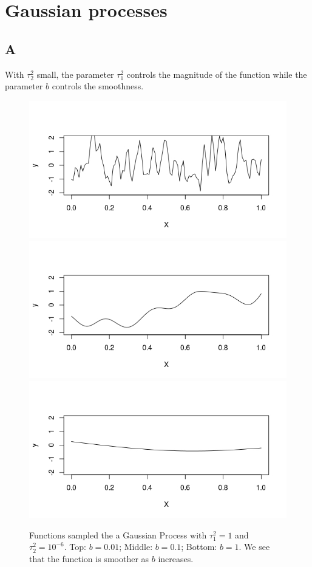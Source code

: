 \documentclass{article}
\begin{document}
\section*{Gaussian processes}
\subsection*{A}
With \(\tau^2_2\) small, the parameter \(\tau^2_1\) controls the magnitude of the function while the parameter \(b\) controls the smoothness.
\begin{figure}
\includegraphics[width=\textwidth]{gp_b001.jpeg}
\includegraphics[width=\textwidth]{gp_b01.jpeg}
\includegraphics[width=\textwidth]{gp_b1.jpeg}
\caption{Functions sampled the a Gaussian Process with \(\tau_1^2 = 1\) and \(\tau_2^2 = 10^{-6}\). Top: \(b = 0.01\); Middle: \(b = 0.1\); Bottom: \(b = 1\). We see that the function is smoother as \(b\) increases.}
\label{fig:gp_b}
\end{figure}
\end{document}
